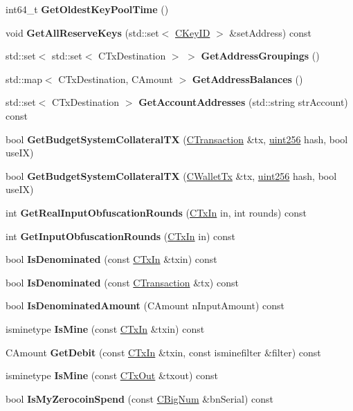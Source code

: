 \begin{DoxyCompactItemize}
\item 
int64\+\_\+t {\bfseries Get\+Oldest\+Key\+Pool\+Time} ()
\item 
void {\bfseries Get\+All\+Reserve\+Keys} (std\+::set$<$ \mbox{\hyperlink{class_c_key_i_d}{C\+Key\+ID}} $>$ \&set\+Address) const
\item 
std\+::set$<$ std\+::set$<$ C\+Tx\+Destination $>$ $>$ {\bfseries Get\+Address\+Groupings} ()
\item 
std\+::map$<$ C\+Tx\+Destination, C\+Amount $>$ {\bfseries Get\+Address\+Balances} ()
\item 
std\+::set$<$ C\+Tx\+Destination $>$ {\bfseries Get\+Account\+Addresses} (std\+::string str\+Account) const
\item 
bool {\bfseries Get\+Budget\+System\+Collateral\+TX} (\mbox{\hyperlink{class_c_transaction}{C\+Transaction}} \&tx, \mbox{\hyperlink{classuint256}{uint256}} hash, bool use\+IX)
\item 
bool {\bfseries Get\+Budget\+System\+Collateral\+TX} (\mbox{\hyperlink{class_c_wallet_tx}{C\+Wallet\+Tx}} \&tx, \mbox{\hyperlink{classuint256}{uint256}} hash, bool use\+IX)
\item 
int {\bfseries Get\+Real\+Input\+Obfuscation\+Rounds} (\mbox{\hyperlink{class_c_tx_in}{C\+Tx\+In}} in, int rounds) const
\item 
int {\bfseries Get\+Input\+Obfuscation\+Rounds} (\mbox{\hyperlink{class_c_tx_in}{C\+Tx\+In}} in) const
\item 
bool {\bfseries Is\+Denominated} (const \mbox{\hyperlink{class_c_tx_in}{C\+Tx\+In}} \&txin) const
\item 
bool {\bfseries Is\+Denominated} (const \mbox{\hyperlink{class_c_transaction}{C\+Transaction}} \&tx) const
\item 
bool {\bfseries Is\+Denominated\+Amount} (C\+Amount n\+Input\+Amount) const
\item 
isminetype {\bfseries Is\+Mine} (const \mbox{\hyperlink{class_c_tx_in}{C\+Tx\+In}} \&txin) const
\item 
C\+Amount {\bfseries Get\+Debit} (const \mbox{\hyperlink{class_c_tx_in}{C\+Tx\+In}} \&txin, const isminefilter \&filter) const
\item 
\mbox{\label{class_c_wallet_a01e86e06b2dfbff1560fc5a1b9af384e}} 
isminetype {\bfseries Is\+Mine} (const \mbox{\hyperlink{class_c_tx_out}{C\+Tx\+Out}} \&txout) const
\item 
bool {\bfseries Is\+My\+Zerocoin\+Spend} (const \mbox{\hyperlink{class_c_big_num}{C\+Big\+Num}} \&bn\+Serial) const

\end{DoxyCompactItemize}
